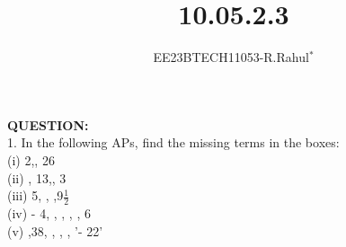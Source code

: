 \documentclass[journal,12pt,twocolumn]{IEEEtran}
\theoremstyle{remark}
\begin{document}

\vspace{3cm}
\title{\textbf{10.05.2.3}}
\author{EE23BTECH11053-R.Rahul$^{*}$%
}

\maketitle
\textbf{QUESTION:}
\\
1. In the following APs, find the missing terms in the boxes:\\
(i) 2,\textunderscore, 26 \\
(ii) \textunderscore, 13,\textunderscore , 3\\
(iii)  5,  \textunderscore, \textunderscore,9\(\frac{1}{2}\) \\
(iv) - 4, \textunderscore,  \textunderscore, \textunderscore, \textunderscore, 6\\
(v)  \textunderscore,38, \textunderscore, \textunderscore, \textunderscore, '- 22'\\

\solution

\end{document}
